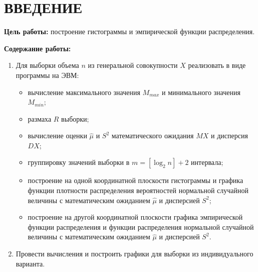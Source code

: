 \chapter*{\hfill{\centering ВВЕДЕНИЕ}\hfill}

\textbf{Цель работы:} построение гистограммы и эмпирической функции распределения.

\textbf{Содержание работы:}
\begin{enumerate}
    \item Для выборки объема $n$ из генеральной совокупности $X$ реализовать в виде программы на ЭВМ:
    \begin{itemize}
        \item вычисление  максимального значения $M_{max}$ и минимального значения $M_{min}$;
        \item размаха $R$ выборки;
        \item вычисление оценки $\hat{\mu}$ и $S^2$ математического ожидания $MX$ и дисперсия $DX$;
        \item группировку значений выборки в $m = [\log_{2}n] + 2$ интервала;
        \item построение на одной координатной плоскости гистограммы и графика функции плотности распределения вероятностей нормальной случайной величины с математическим ожиданием $\hat{\mu}$ и дисперсией $S^2$;
        \item построение на другой координатной плоскости графика эмпирической функции распределения и функции распределения нормальной случайной величины с математическим ожиданием $\hat{\mu}$ и дисперсией $S^2$.
    \end{itemize}
    \item Провести вычисления и построить графики для выборки из индивидуального варианта.
\end{enumerate}